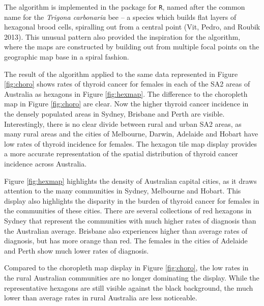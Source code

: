 The algorithm is implemented in the  package for \texttt{R}, named after the common name for the \emph{Trigona carbonaria} bee -- a species which builds flat layers of hexagonal brood cells, spiralling out from a central point (Vit, Pedro, and Roubik 2013). This unusual pattern also provided the inspiration for the algorithm, where the maps are constructed by building out from multiple focal points on the geographic map base in a spiral fashion.

The result of the algorithm applied to the same data represented in Figure \ref{fig:choro} shows rates of thyroid cancer for females in each of the SA2 areas of Australia as hexagons in Figure \ref{fig:hexmap}.
The difference to the choropleth map in Figure \ref{fig:choro} are clear. Now the higher thyroid cancer incidence in the densely populated areas in Sydney, Brisbane and Perth are visible. Interestingly, there is no clear divide between rural and urban SA2 areas, as many rural areas and the cities of Melbourne, Darwin, Adelaide and Hobart have low rates of thyroid incidence for females. The hexagon tile map display provides a more accurate representation of the spatial distribution of thyroid cancer incidence across Australia.

Figure \ref{fig:hexmap} highlights the density of Australian capital cities, as it draws attention to the many communities in Sydney, Melbourne and Hobart. This display also highlights the disparity in the burden of thyroid cancer for females in the communities of these cities. There are several collections of red hexagons in Sydney that represent the communities with much higher rates of diagnosis than the Australian average. Brisbane also experiences higher than average rates of diagnosis, but has more orange than red. The females in the cities of Adelaide and Perth show much lower rates of diagnosis.

Compared to the choropleth map display in Figure \ref{fig:choro}, the low rates in the rural Australian communities are no longer dominating the display. While the representative hexagons are still visible against the black background, the much lower than average rates in rural Australia are less noticeable.

